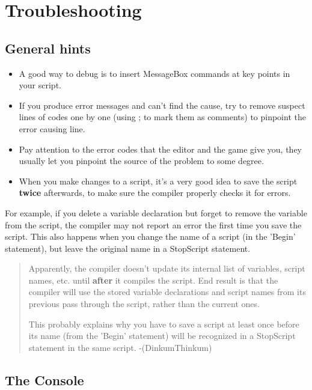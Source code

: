 \documentclass[
]{article}
\begin{document}
\hypertarget{troubleshooting}{%
\section{Troubleshooting}\label{troubleshooting}}

\hypertarget{general-hints}{%
\subsection{General hints}\label{general-hints}}

\begin{itemize}
\item
  A good way to debug is to insert MessageBox commands at key points in
  your script.
\item
  If you produce error messages and can't find the cause, try to remove
  suspect lines of codes one by one (using ; to mark them as comments)
  to pinpoint the error causing line.
\item
  Pay attention to the error codes that the editor and the game give
  you, they usually let you pinpoint the source of the problem to some
  degree.
\item
  When you make changes to a script, it's a very good idea to save the
  script \textbf{twice} afterwards, to make sure the compiler properly
  checks it for errors.
\end{itemize}

For example, if you delete a variable declaration but forget to remove
the variable from the script, the compiler may not report an error the
first time you save the script. This also happens when you change the
name of a script (in the 'Begin' statement), but leave the original name
in a StopScript statement.

\begin{quote}
Apparently, the compiler doesn't update its internal list of variables,
script names, etc. until \textbf{after} it compiles the script. End
result is that the compiler will use the stored variable declarations
and script names from its previous pass through the script, rather than
the current ones.

This probably explains why you have to save a script at least once
before its name (from the 'Begin' statement) will be recognized in a
StopScript statement in the same script. -(DinkumThinkum)
\end{quote}

\hypertarget{the-console}{%
\subsection{The Console}\label{the-console}}
\end{document}
